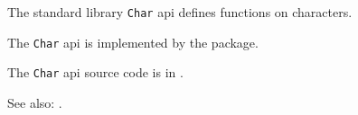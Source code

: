 
The standard library {\tt Char} api defines functions on characters.

The {\tt Char} api is implemented by the  package.

The {\tt Char} api source code is in .

See also: .





